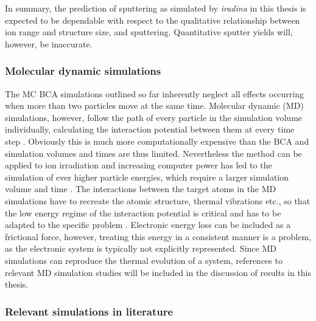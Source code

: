 In summary, the prediction of sputtering as simulated by \emph{iradina} in this thesis is expected to be dependable with respect to the qualitative relationship between ion range and structure size, and sputtering. Quantitative sputter yields will, however, be inaccurate.


\subsubsection{Molecular dynamic simulations}

The MC BCA simulations outlined so far inherently neglect all effects occurring when more than two particles move at the same time. Molecular dynamic (MD) simulations, however, follow the path of every particle in the simulation volume individually, calculating the interaction potential between them at every time step \cite{alder_studies_1959}. Obviously this is much more computationally expensive than the BCA and simulation volumes and times are thus limited. Nevertheless the method can be applied to ion irradiation \cite{nordlund_molecular_1995} and increasing computer power has led to the simulation of ever higher particle energies, which require a larger simulation volume and time \cite{greaves_enhanced_2013,baumer_prediction_2014,anders_sputtering_2015}. The interactions between the target atoms in the MD simulations have to recreate the atomic structure, thermal vibrations etc., so that the low energy regime of the interaction potential is critical and has to be adapted to the specific problem \cite{dedkov_interatomic_1995,nordlund_repulsive_1997,albe_modeling_2002,nordlund_interatomic_2008}. Electronic energy loss can be included as a frictional force, however, treating this energy in a consistent manner is a problem, as the electronic system is typically not explicitly represented. Since MD simulations can reproduce the thermal evolution of a system, references to relevant MD simulation studies will be included in the discussion of results in this thesis.


\subsubsection{Relevant simulations in literature}

